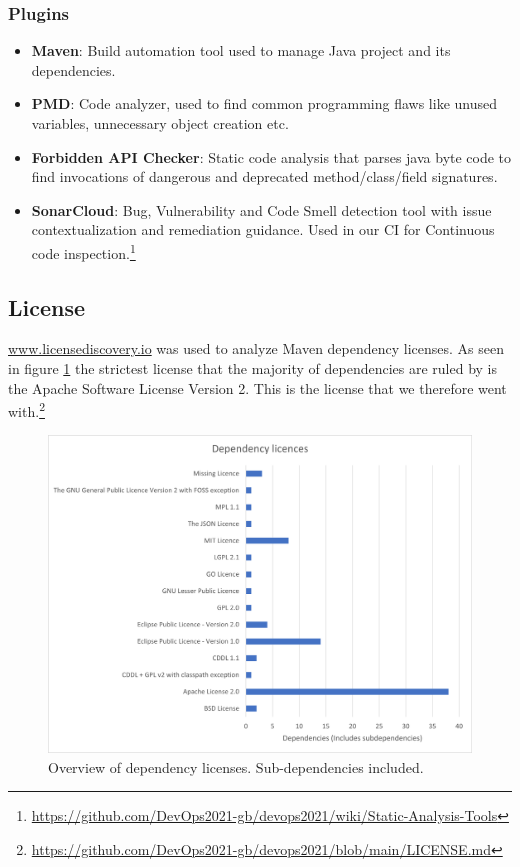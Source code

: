 \subsubsection{Plugins}
\begin{itemize}
    \item \textbf{Maven}: Build automation tool used to manage Java project and its dependencies.
    \item \textbf{PMD}: Code analyzer, used to find common programming flaws like unused variables, unnecessary object creation etc. 
    \item \textbf{Forbidden API Checker}: Static code analysis that parses java byte code to find invocations of dangerous and deprecated method/class/field signatures. 
    \item \textbf{SonarCloud}: Bug, Vulnerability and Code Smell detection tool with issue contextualization and remediation guidance. Used in our CI for Continuous code inspection.\footnote{\url{https://github.com/DevOps2021-gb/devops2021/wiki/Static-Analysis-Tools}}
\end{itemize}

\subsection{License}
\url{www.licensediscovery.io} was used to analyze Maven dependency licenses. As seen in figure \ref{fig:licenceDep} the strictest license that the majority of dependencies are ruled by is the Apache Software License Version 2. This is the license that we therefore went with.\footnote{\url{https://github.com/DevOps2021-gb/devops2021/blob/main/LICENSE.md}}
\begin{figure}[H]
    \centering
    \includegraphics[scale=0.65]{images/dependency_licences.png}
    \caption{Overview of dependency licenses. Sub-dependencies included.}
    \label{fig:licenceDep}
\end{figure}
